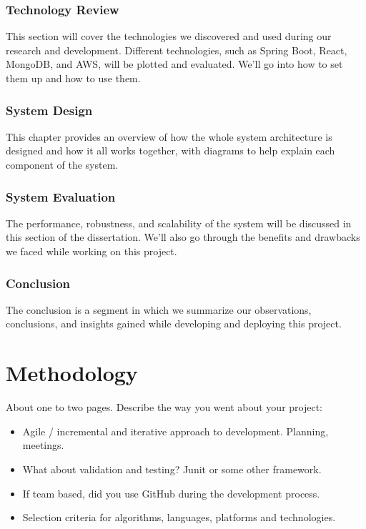 \subsection{Technology Review}
This section will cover the technologies we discovered and used during our research and development. Different technologies, such as Spring Boot, React, MongoDB, and AWS, will be plotted and evaluated. We'll go into how to set them up and how to use them. 

\subsection{System Design}
This chapter provides an overview of how the whole system architecture is designed and how it all works together, with diagrams to help explain each component of the system. 

\subsection{System Evaluation}
The performance, robustness, and scalability of the system will be discussed in this section of the dissertation. We'll also go through the benefits and drawbacks we faced while working on this project. 

\subsection{Conclusion}
The conclusion is a segment in which we summarize our observations, conclusions, and insights gained while developing and deploying this project. 




\chapter{Methodology}
About one to two pages.
Describe the way you went about your project:
\begin{itemize}
\item Agile / incremental and iterative approach to development. Planning, meetings.
\item What about validation and testing? Junit or some other framework.
\item If team based, did you use GitHub during the development process.
\item Selection criteria for algorithms, languages, platforms and technologies.
\end{itemize}
\section{}
